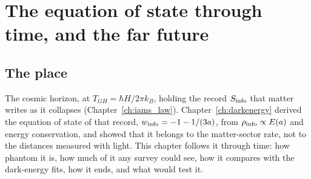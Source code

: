 \chapter{The equation of state through time, and the far future}\label{ch:wzfuture}

\section*{The place}
The cosmic horizon, at $T_{GH}=\hbar H/2\pi k_B$, holding the record $S_{\rm info}$ that matter writes as it collapses (Chapter~\ref{ch:iams_law}).
Chapter~\ref{ch:darkenergy} derived the equation of state of that record, $w_{\rm info}=-1-1/(3a)$, from $\rho_{\rm info}\propto E(a)$ and energy
conservation, and showed that it belongs to the matter-sector rate, not to the distances measured with light. This chapter follows it through time:
how phantom it is, how much of it any survey could see, how it compares with the dark-energy fits, how it ends, and what would test it.

